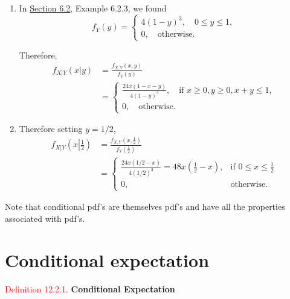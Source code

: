 \documentclass[
]{book}
\providecommand{\tightlist}{%
  \setlength{\itemsep}{0pt}\setlength{\parskip}{0pt}}
\begin{document}
\hypertarget{CondDis:ex:cond_pdf_sol}{}
\begin{enumerate}
\def\labelenumi{(\alph{enumi})}
\tightlist
\item
  In \protect\hyperlink{jointdis:cdf}{Section 6.2}, Example 6.2.3, we found\\

  \[f_Y(y) = \begin{cases} 4(1-y)^3, \quad 0 \leq y \leq 1, \\[5pt]
  0, \quad \text{otherwise.} \end{cases}\]

  Therefore,\\

  \begin{align*}
  f_{X|Y}(x|y) &= \frac{f_{X,Y}(x,y)}{f_Y(y)} \\[9pt]
  &= \begin{cases}
  \frac{24x(1-x-y)}{4(1-y)^3}, \quad \text{if } x \geq 0, y \geq 0, x+y \leq 1, \\[5pt]
  0, \quad \text{otherwise.} \end{cases}
  \end{align*}

  \hfill\break
\item
  Therefore setting \(y=1/2\),\\

  \begin{align*}
  f_{X|Y}\left(x \left|\frac{1}{2} \right. \right) &= \frac{f_{X,Y}(x,\frac{1}{2})}{f_Y(\frac{1}{2})} \\[9pt]
  &= \begin{cases} \frac{24x(1/2-x)}{4(1/2)^3} = 48x\left(\frac{1}{2}-x \right) , & \text{if } 0 \leq x \leq \frac{1}{2} \\[5pt]
  0, & \text{otherwise.} \end{cases}
  \end{align*}
\end{enumerate}

\hfill\break

Note that conditional pdf's are themselves pdf's and have all the properties associated with pdf's.

\hypertarget{CondDis:CondExpect}{%
\section{Conditional expectation}\label{CondDis:CondExpect}}

\leavevmode{}%
\textcolor{red}{Definition 12.2.1.}
{\textbf{Conditional Expectation}}
\end{document}
